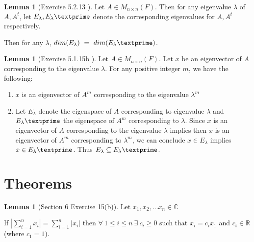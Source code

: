 \documentclass{amsart}
\theoremstyle{definition}
\newtheorem{lemma}[theorem]{Lemma}
\theoremstyle{remark}
\numberwithin{equation}{section}
\begin{document}
\begin{lemma}[Exercise 5.2.13 \cite{friedberg2003linear}]\label{exercise5213}
Let $A \in M_{n \times n}(F)$.
Then for any eigenvalue $\lambda$ of $A, A^t$, let $E_{\lambda}, E_{\lambda}\textprime$ denote the corresponding eigenvalues for $A, A^t$ respectively.


Then for any $\lambda$, $dim(E_{\lambda})\ =\  dim(E_{\lambda}\textprime)$.

\end{lemma}

\begin{lemma}[Exercise 5.1.15b \cite{friedberg2003linear}]\label{exercise5115}
Let $A \in M_{n \times n}(F)$.
Let $x$ be an eigenvector of $A$ corresponding to the eigenvalue $\lambda$.
For any positive integer $m$, we have the following:

\begin{enumerate}
	\item 
		$x$ is an eigenvector of $A^m$ corresponding to the eigenvalue $\lambda^m$

	\item 
		Let $E_{\lambda}$ denote the eigenspace of $A$ corresponding to eigenvalue $\lambda$ and $E_{\lambda}\textprime$ the eigenspace of $A^m$ corresponding to $\lambda$.
		Since $x$ is an eigenvector of $A$ corresponding to the eigenvalue $\lambda$ implies then $x$ is an eigenvector of $A^m$ corresponding to $\lambda^m$, we can conclude $x \in E_{\lambda}$ implies $x \in E_{\lambda}\textprime$.
		Thus $E_{\lambda} \subseteq E_{\lambda}\textprime$.

\end{enumerate}

\end{lemma}



\section{Theorems}


\begin{lemma}[Section 6 Exercise 15(b)]
Let $x_1, x_2, \ldots x_n \in \mathbb{C}$

If $|\sum_{i = 1}^n x_i| = \sum_{i = 1}^{n}| x_i|$ then $\forall\ 1 \leq i \leq n\ \exists\ c_i \geq 0$ such that $x_i = c_ix_1$ and $c_i \in \mathbb{R}$ (where $c_1 = 1$).

\end{lemma}
\end{document}
